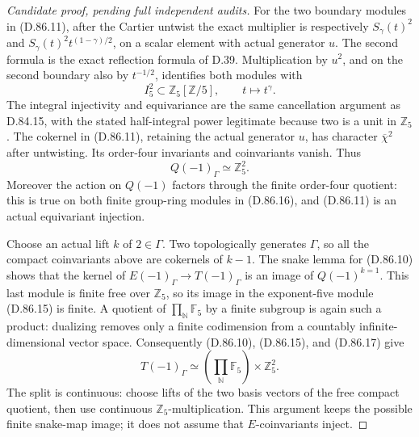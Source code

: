 \begin{proof}[Candidate proof, pending full independent audits]
For the two boundary modules in (D.86.11), after the Cartier
untwist the exact multiplier is respectively
\(S_\gamma(t)^2\) and
\(S_\gamma(t)^2t^{(1-\gamma)/2}\), on a scalar element
with actual generator \(u\). The second formula is the exact
reflection formula of D.39. Multiplication by \(u^2\), and
on the second boundary also by \(t^{-1/2}\), identifies both
modules with
\[
 I_5^2\subset\mathbb Z_5[\mathbb Z/5],
 \qquad t\longmapsto t^\gamma.                         \tag{D.86.16}
\]
The integral injectivity and equivariance are the same
cancellation argument as D.84.15, with the stated half-integral
power legitimate because two is a unit in \(\mathbb Z_5\).
The cokernel in (D.86.11), retaining the actual generator \(u\),
has character \(\overline\chi^2\) after untwisting. Its
order-four invariants and coinvariants vanish. Thus
\[
                      Q(-1)_\Gamma\simeq\mathbb Z_5^2.
                                                               \tag{D.86.17}
\]
Moreover the action on \(Q(-1)\) factors through the finite
order-four quotient: this is true on both finite group-ring
modules in (D.86.16), and (D.86.11) is an actual equivariant
injection.

Choose an actual lift \(k\) of \(2\in\Gamma\). Two
topologically generates \(\Gamma\), so all the compact
coinvariants above are cokernels of \(k-1\). The snake lemma
for (D.86.10) shows that the kernel of
\(E(-1)_\Gamma\to T(-1)_\Gamma\) is an image of
\(Q(-1)^{k=1}\). This last module is finite free over
\(\mathbb Z_5\), so its image in the exponent-five module
(D.86.15) is finite. A quotient of
\(\prod_{\mathbb N}\mathbb F_5\) by a finite subgroup is
again such a product: dualizing removes only a finite
codimension from a countably infinite-dimensional vector space.
Consequently (D.86.10), (D.86.15), and (D.86.17) give
\[
 T(-1)_\Gamma\simeq
             \left(\prod_{\mathbb N}\mathbb F_5\right)
                           \times\mathbb Z_5^2.        \tag{D.86.18}
\]
The split is continuous: choose lifts of the two basis vectors
of the free compact quotient, then use continuous
\(\mathbb Z_5\)-multiplication. This argument keeps the
possible finite snake-map image; it does not assume that
\(E\)-coinvariants inject.


\end{proof}
